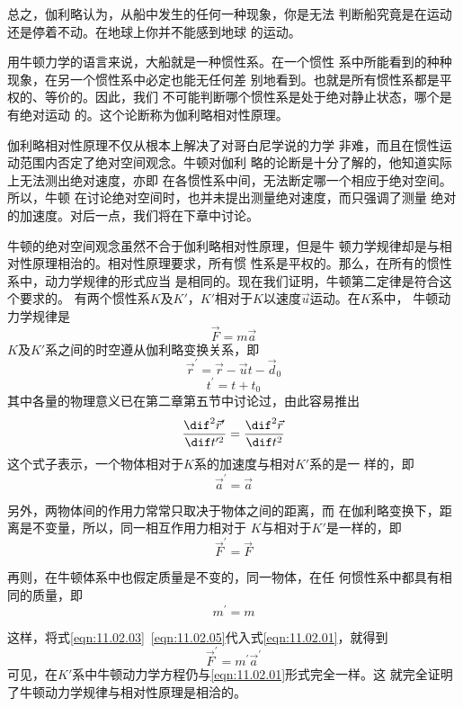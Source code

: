 \documentclass[../outline-of-mechanics.tex]{subfiles}
\begin{document}
总之，伽利略认为，从船中发生的任何一种现象，你是无法
判断船究竟是在运动还是停着不动。在地球上你并不能感到地球
的运动。

用牛顿力学的语言来说，大船就是一种惯性系。在一个惯性
系中所能看到的种种现象，在另一个惯性系中必定也能无任何差
别地看到。也就是所有惯性系都是平权的、等价的。因此，我们
不可能判断哪个惯性系是处于绝对静止状态，哪个是有绝对运动
的。这个论断称为伽利略相对性原理。

伽利略相对性原理不仅从根本上解决了对哥白尼学说的力学
非难，而且在惯性运动范围内否定了绝对空间观念。牛顿对伽利
略的论断是十分了解的，他知道实际上无法测出绝对速度，亦即
在各惯性系中间，无法断定哪一个相应于绝对空间。所以，牛顿
在讨论绝对空间时，也并未提出测量绝对速度，而只强调了测量
绝对的加速度。对后一点，我们将在下章中讨论。

牛顿的绝对空间观念虽然不合于伽利略相对性原理，但是牛
顿力学规律却是与相对性原理相治的。相对性原理要求，所有惯
性系是平权的。那么，在所有的惯性系中，动力学规律的形式应当
是相同的。现在我们证明，牛顿第二定律是符合这个要求的。
有两个惯性系$ K $及$ K' $，$ K' $相对于$ K $以速度$ \vec{u} $运动。在$ K $系中，
牛顿动力学规律是
\begin{equation}\label{eqn:11.02.01}
  \vec{F} = m \vec{a}
\end{equation}
$ K $及$ K' $系之间的时空遵从伽利略变换关系，即
\begin{equation}\label{eqn:11.02.02}
  \vec{r} ^ { \prime } = \vec{r} - \vec{u} t - \vec{d} _ { 0 }
\end{equation}
\begin{equation*}
  t ^ { \prime } = t + t _ { 0 }
\end{equation*}
其中各量的物理意义已在第二章第五节中讨论过，由此容易推出
\begin{equation*}
  \frac { \dif ^ { 2 } \vec{r} ^ { \prime } } { \dif t ^ { \prime 2 } } = \frac { \dif ^ { 2 } \vec{r} } { \dif t ^ { 2 } }
\end{equation*}
这个式子表示，一个物体相对于$ K $系的加速度与相对$ K' $系的是一
样的，即
\begin{equation}\label{eqn:11.02.03}
  \vec{a} ^ { \prime } = \vec{a}
\end{equation}

另外，两物体间的作用力常常只取决于物体之间的距离，而
在伽利略变换下，距离是不变量，所以，同一相互作用力相对于
$ K $与相对于$ K' $是一样的，即
\begin{equation}\label{eqn:11.02.04}
  \vec{F} ^ { \prime } = \vec{F}
\end{equation}

再则，在牛顿体系中也假定质量是不变的，同一物体，在任
何惯性系中都具有相同的质量，即
\begin{equation}\label{eqn:11.02.05}
  m ^ { \prime } = m
\end{equation}

这样，将式\eqref{eqn:11.02.03}~\eqref{eqn:11.02.05}代入式\eqref{eqn:11.02.01}，就得到
\begin{equation}\label{eqn:11.02.06}
  \vec{F} ^ { \prime } = m ^ { \prime } \vec{a} ^ { \prime }
\end{equation}
可见，在$ K' $系中牛顿动力学方程仍与\eqref{eqn:11.02.01}形式完全一样。这
就完全证明了牛顿动力学规律与相对性原理是相洽的。
\end{document}
